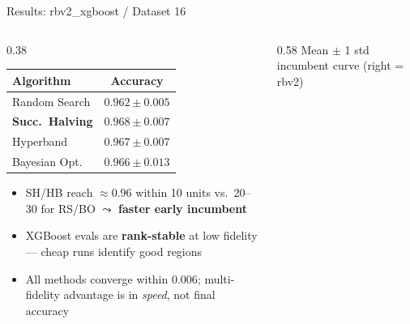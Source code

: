 \documentclass[t,english]{beamer}
\begin{document}
\begin{frame}{Results: rbv2\_xgboost / Dataset 16}
  \begin{columns}[T]
    \begin{column}{0.38\textwidth}
      \renewcommand{\tabcolsep}{3pt}
      \renewcommand{\arraystretch}{1.1}
      \begin{footnotesize}
      \begin{tabular}{lc}
        \toprule
        \textbf{Algorithm} & \textbf{Accuracy} \\
        \midrule
        Random Search            & $0.962 \pm 0.005$ \\
        \textbf{Succ.\ Halving}  & $\mathbf{0.968 \pm 0.007}$ \\
        Hyperband                & $0.967 \pm 0.007$ \\
        Bayesian Opt.            & $0.966 \pm 0.013$ \\
        \bottomrule
      \end{tabular}
      \end{footnotesize}

      \vspace{0.4em}
      \begin{itemize}\setlength\itemsep{3pt}
        \item[\small$\blacktriangleright$] {\scriptsize SH/HB reach ${\approx}0.96$ within \alert{10 units} vs.\ 20--30 for RS/BO $\leadsto$ \textbf{faster early incumbent}}
        \item[\small$\blacktriangleright$] {\scriptsize XGBoost evals are \textbf{rank-stable} at low fidelity — cheap runs identify good regions}
        \item[\small$\blacktriangleright$] {\scriptsize All methods converge within $0.006$; multi-fidelity advantage is in \emph{speed}, not final accuracy}
      \end{itemize}
    \end{column}
    \begin{column}{0.58\textwidth}
      \vskip-8pt
      {\tiny Mean $\pm$ 1 std incumbent curve (right = rbv2)}
    \end{column}
  \end{columns}
\end{frame}
\end{document}
